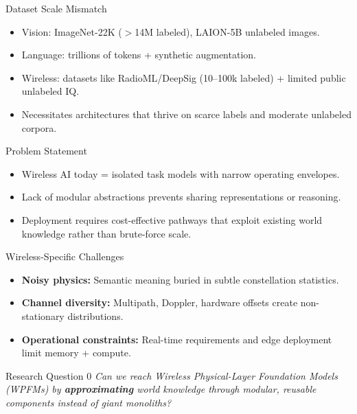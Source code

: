 \begin{frame}{Dataset Scale Mismatch}
    \begin{itemize}
        \item Vision: ImageNet-22K ($>$14M labeled), LAION-5B unlabeled images.
        \item Language: trillions of tokens + synthetic augmentation.
        \item Wireless: datasets like RadioML/DeepSig (10–100k labeled) + limited public unlabeled IQ.
        \item Necessitates architectures that thrive on scarce labels and moderate unlabeled corpora.
    \end{itemize}
\end{frame}

\begin{frame}{Problem Statement}
    \begin{itemize}
        \item Wireless AI today = isolated task models with narrow operating envelopes.
        \item Lack of modular abstractions prevents sharing representations or reasoning.
        \item Deployment requires cost-effective pathways that exploit existing world knowledge rather than brute-force scale.
    \end{itemize}
\end{frame}

\begin{frame}{Wireless-Specific Challenges}
    \begin{itemize}
        \item \textbf{Noisy physics:} Semantic meaning buried in subtle constellation statistics.
        \item \textbf{Channel diversity:} Multipath, Doppler, hardware offsets create non-stationary distributions.
        \item \textbf{Operational constraints:} Real-time requirements and edge deployment limit memory + compute.
    \end{itemize}
\end{frame}

\begin{frame}{Research Question 0}
    \centering
    \Large
    \textit{Can we reach Wireless Physical-Layer Foundation Models (WPFMs) by \textbf{approximating} world knowledge through modular, reusable components instead of giant monoliths?}
\end{frame}

